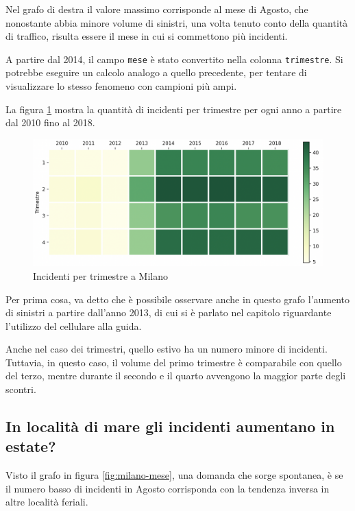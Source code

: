\documentclass[a4paper,12pt]{report}
\newcommand{\columnstyle}[1]{\texttt{#1}}
\newcommand{\skipline}{\vspace{0.2in}}
\begin{document}
Nel grafo di destra il valore massimo corrisponde al mese di Agosto, 
che nonostante abbia minore volume di sinistri, 
una volta tenuto conto della quantità di traffico, risulta essere 
il mese in cui si commettono più incidenti.

\skipline
A partire dal 2014, il campo \columnstyle{mese} è stato convertito nella 
colonna \columnstyle{trimestre}. 
Si potrebbe eseguire un calcolo analogo a quello precedente, per tentare di visualizzare lo 
stesso fenomeno con campioni più ampi.

La figura \ref{fig:milano-trimestri} mostra la quantità di incidenti per 
trimestre per ogni anno a partire dal 2010 fino al 2018.

\begin{figure}
    \includegraphics[width=\linewidth]{../src/incidenti/incidenti_senza_coords/mese_incidenti/trimestri.png}
    \caption{Incidenti per trimestre a Milano}
    \label{fig:milano-trimestri}
\end{figure}

Per prima cosa, va detto che è possibile osservare anche in questo grafo 
l'aumento di sinistri a partire dall'anno 2013, di cui si è parlato nel capitolo 
riguardante l'utilizzo del cellulare alla guida.

Anche nel caso dei trimestri, quello estivo ha un numero minore di incidenti. 
Tuttavia, in questo caso, il volume del primo trimestre è comparabile 
con quello del terzo, 
mentre durante il secondo e il quarto avvengono la maggior parte degli scontri.

\subsection{In località di mare gli incidenti aumentano in estate?}

Visto il grafo in figura \ref{fig:milano-mese}, una domanda che sorge spontanea, è se 
il numero basso di incidenti in Agosto corrisponda con la tendenza inversa in 
altre località feriali. 
\end{document}
